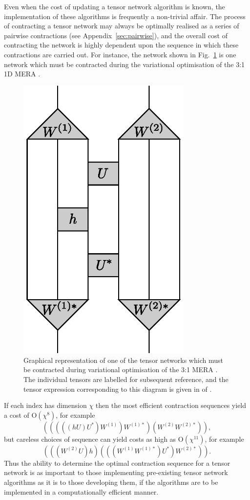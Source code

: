 \documentclass[aps,pre,reprint,superscriptaddress,amsfonts,amsmath,showpacs,nofootinbib,floatfix]{revtex4-1}
\newcommand{\mrm}[1]{\mathrm{#1}}
\newcommand{\fref}[1]{Fig.~\ref{#1}}
\newcommand{\aref}[1]{Appendix~\ref{#1}}
\newcommand{\pEref}[1]{\protect{Eq.~(\ref{#1})}}
\newcommand{\psref}[1]{\protect{Sec.~\ref{#1}}}
\newcommand{\pcite}[1]{\protect{\cite{#1}}}
\newcommand{\OO}[1]{\mrm{O}(#1)}
\begin{document}
Even when the cost of updating a tensor network algorithm is known, the implementation of these algorithms is frequently a non-trivial affair. The process of contracting a tensor network may always be optimally realised as a series of pairwise contractions (see \aref{sec:pairwise}), and the overall cost of contracting the network is highly dependent upon the sequence in which these contractions are carried out. For instance, the network shown in \fref{fig:31MERA} is one network which must be contracted during the variational optimisation of the 3:1 1D MERA \cite{evenbly2009,vidal2010}. 
\begin{figure}
\includegraphics[width=246.0pt]{31MERA}
\caption{\label{fig:31MERA}Graphical representation of one of the tensor networks which must be contracted during variational optimisation of the 3:1 MERA \pcite{evenbly2009,vidal2010}. The individual tensors are labelled for subsequent reference, and the tensor expression corresponding to this diagram is given in \pEref{eq:31MERA} of \psref{sec:results}. %
}
\end{figure}%
If each index has dimension $\chi$ then the most efficient contraction sequences yield a cost of $\OO{\chi^8}$, for example
\begin{equation}
(((((hU)U^*)W^{(1)})W^{(1)*})(W^{(2)}W^{(2)*})),
\end{equation}
but careless choices of sequence can yield costs as high as $\OO{\chi^{11}}$, for example
\begin{equation}
(((W^{(2)}U)h)(((W^{(1)}W^{(1)*})U^*)W^{(2)*})).
\end{equation} 
Thus the ability to determine the optimal contraction sequence for a tensor network is as important to those implementing pre-existing tensor network algorithms as it is to those developing them, if the algorithms are to be implemented in a computationally efficient manner.
\end{document}
